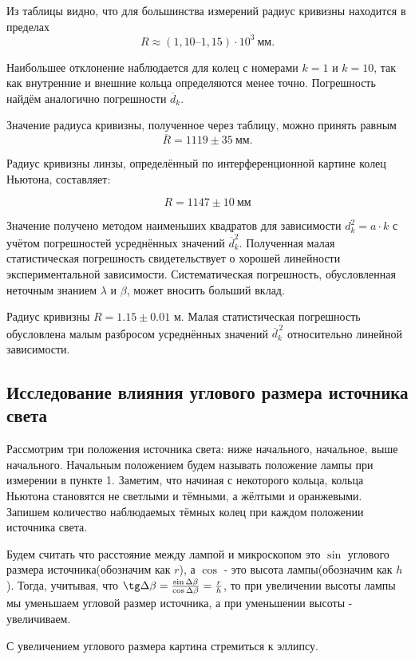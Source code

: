Из таблицы видно, что для большинства измерений радиус кривизны находится в пределах
\[
R \approx (1{,}10\text{--}1{,}15) \cdot 10^3\ \text{мм}.
\]

Наибольшее отклонение наблюдается для колец с номерами $k=1$ и $k=10$, так как внутренние и внешние кольца определяются менее точно. Погрешность найдём аналогично погрешности $\overline{d}_k$.

Значение радиуса кривизны, полученное через таблицу, можно принять равным
\[
\overline{R} = 1119 \pm 35\ \text{мм}.
\]

Радиус кривизны линзы, определённый по интерференционной картине колец Ньютона, составляет:

\[
R = 1147 \pm 10 ~\text{мм}
\]

Значение получено методом наименьших квадратов для зависимости \(d_k^2 = a \cdot k\) с учётом погрешностей усреднённых значений \(\overline{d}_k^2\). Полученная малая статистическая погрешность свидетельствует о хорошей линейности экспериментальной зависимости. Систематическая погрешность, обусловленная неточным знанием \(\lambda\) и \(\beta\), может вносить больший вклад.

Радиус кривизны $R = 1.15 \pm 0.01$ м. 
Малая статистическая погрешность обусловлена малым разбросом 
усреднённых значений $\overline{d}_k^{\,2}$ относительно линейной зависимости. 

\subsection{Исследование влияния углового размера источника света}

Рассмотрим три положения источника света: ниже начального, начальное, выше начального. Начальным положением будем называть положение лампы при измерении в пункте 1. Заметим, что начиная с некоторого кольца, кольца Ньютона становятся не светлыми и тёмными, а жёлтыми и оранжевыми. Запишем количество наблюдаемых тёмных колец при каждом положении источника света.

Будем считать что расстояние между лампой и микроскопом это $\sin$ углового размера источника(обозначим как $r$), а $\cos$ - это высота лампы(обозначим как $h$). Тогда, учитывая, что $\tg \Delta \beta = \frac {\sin \Delta \beta}{\cos \Delta \beta} = \frac{r}{h}$, то при увеличении высоты лампы мы уменьшаем угловой размер источника, а при уменьшении высоты - увеличиваем. 

С увеличением углового размера картина стремиться к эллипсу.

